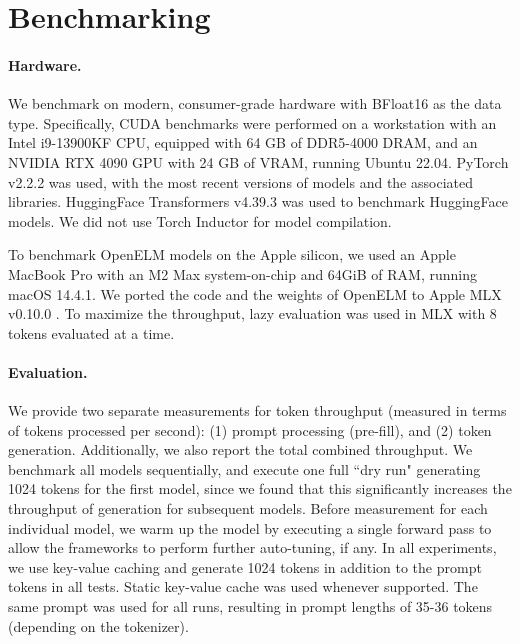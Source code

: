 \documentclass[10pt,twocolumn,letterpaper]{article}
\makeatletter
\newcommand{\model}{OpenELM\@\xspace}
\makeatother
\begin{document}
\begin{table}[t!]
\label{tab:peft-results}
\end{table}

\section{Benchmarking}
\label{sec:benchmarking}

\paragraph{Hardware.} We benchmark on modern, consumer-grade hardware with BFloat16 as the data type. Specifically, CUDA benchmarks were performed on a workstation with an Intel i9-13900KF CPU, equipped with 64 GB of DDR5-4000 DRAM, and an NVIDIA RTX 4090 GPU with 24 GB of VRAM, running Ubuntu 22.04. PyTorch v2.2.2 \cite{Paszke_PyTorch_An_Imperative_2019} was used, with the most recent versions of models and the associated libraries. HuggingFace Transformers v4.39.3 \cite{wolf-etal-2020-transformers} was used to benchmark HuggingFace models. We did not use Torch Inductor for model compilation.

To benchmark \model models on the Apple silicon, we used an Apple MacBook Pro with an M2 Max system-on-chip and 64GiB of RAM, running macOS 14.4.1. We ported the code and the weights of \model to Apple MLX v0.10.0 \cite{mlx2023}. To maximize the throughput, lazy evaluation was used in MLX with 8 tokens evaluated at a time.

\paragraph{Evaluation.} We provide two separate measurements for token throughput (measured in terms of tokens processed per second): (1) prompt processing (pre-fill), and (2) token generation. Additionally, we also report the total combined throughput. We benchmark all models sequentially, and execute one full ``dry run" generating 1024 tokens for the first model, since we found that this significantly increases the throughput of generation for subsequent models. Before measurement for each individual model, we warm up the model by executing a single forward pass to allow the frameworks to perform further auto-tuning, if any. In all experiments, we use key-value caching and generate 1024 tokens in addition to the prompt tokens in all tests. Static key-value cache was used whenever supported. The same prompt was used for all runs, resulting in prompt lengths of 35-36 tokens (depending on the tokenizer).
\end{document}
